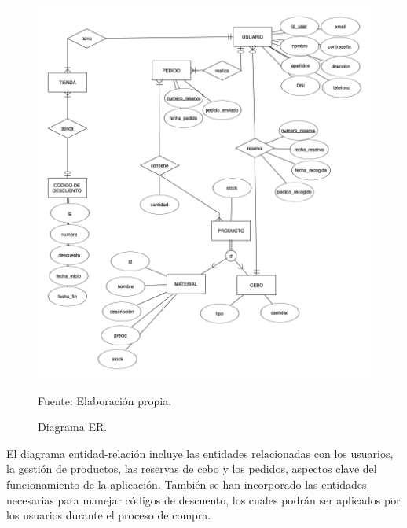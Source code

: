 \begin{figure}[H]
\begin{center}
\includegraphics[scale=0.5]{./Images/diagramaER.png}
\caption{Diagrama ER.} Fuente: Elaboración propia.

\label{fig:fig11}

\end{center}
\end{figure}

El diagrama entidad-relación incluye las entidades relacionadas con los usuarios, la gestión de productos, las reservas de cebo y los pedidos, aspectos clave del funcionamiento de la aplicación. También se han incorporado las entidades necesarias para manejar códigos de descuento, los cuales podrán ser aplicados por los usuarios durante el proceso de compra.